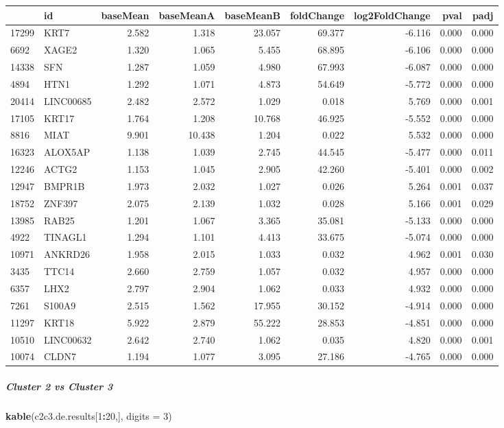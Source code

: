 \documentclass[]{article}
\newenvironment{Shaded}{\begin{snugshade}}{\end{snugshade}}
\newcommand{\DataTypeTok}[1]{\textcolor[rgb]{0.13,0.29,0.53}{#1}}
\newcommand{\DecValTok}[1]{\textcolor[rgb]{0.00,0.00,0.81}{#1}}
\newcommand{\KeywordTok}[1]{\textcolor[rgb]{0.13,0.29,0.53}{\textbf{#1}}}
\newcommand{\NormalTok}[1]{#1}
\newcommand{\OperatorTok}[1]{\textcolor[rgb]{0.81,0.36,0.00}{\textbf{#1}}}
\let\oldsubparagraph\subparagraph
\renewcommand{\subparagraph}[1]{\oldsubparagraph{#1}\mbox{}}
\begin{document}
\begin{longtable}[]{@{}llrrrrrrr@{}}
\toprule
& id & baseMean & baseMeanA & baseMeanB & foldChange & log2FoldChange &
pval & padj\tabularnewline
\midrule
\endhead
17299 & KRT7 & 2.582 & 1.318 & 23.057 & 69.377 & -6.116 & 0.000 &
0.000\tabularnewline
6692 & XAGE2 & 1.320 & 1.065 & 5.455 & 68.895 & -6.106 & 0.000 &
0.000\tabularnewline
14338 & SFN & 1.287 & 1.059 & 4.980 & 67.993 & -6.087 & 0.000 &
0.000\tabularnewline
4894 & HTN1 & 1.292 & 1.071 & 4.873 & 54.649 & -5.772 & 0.000 &
0.000\tabularnewline
20414 & LINC00685 & 2.482 & 2.572 & 1.029 & 0.018 & 5.769 & 0.000 &
0.001\tabularnewline
17105 & KRT17 & 1.764 & 1.208 & 10.768 & 46.925 & -5.552 & 0.000 &
0.000\tabularnewline
8816 & MIAT & 9.901 & 10.438 & 1.204 & 0.022 & 5.532 & 0.000 &
0.000\tabularnewline
16323 & ALOX5AP & 1.138 & 1.039 & 2.745 & 44.545 & -5.477 & 0.000 &
0.011\tabularnewline
12246 & ACTG2 & 1.153 & 1.045 & 2.905 & 42.260 & -5.401 & 0.000 &
0.002\tabularnewline
12947 & BMPR1B & 1.973 & 2.032 & 1.027 & 0.026 & 5.264 & 0.001 &
0.037\tabularnewline
18752 & ZNF397 & 2.075 & 2.139 & 1.032 & 0.028 & 5.166 & 0.001 &
0.029\tabularnewline
13985 & RAB25 & 1.201 & 1.067 & 3.365 & 35.081 & -5.133 & 0.000 &
0.000\tabularnewline
4922 & TINAGL1 & 1.294 & 1.101 & 4.413 & 33.675 & -5.074 & 0.000 &
0.000\tabularnewline
10971 & ANKRD26 & 1.958 & 2.015 & 1.033 & 0.032 & 4.962 & 0.001 &
0.030\tabularnewline
3435 & TTC14 & 2.660 & 2.759 & 1.057 & 0.032 & 4.957 & 0.000 &
0.000\tabularnewline
6357 & LHX2 & 2.797 & 2.904 & 1.062 & 0.033 & 4.932 & 0.000 &
0.000\tabularnewline
7261 & S100A9 & 2.515 & 1.562 & 17.955 & 30.152 & -4.914 & 0.000 &
0.000\tabularnewline
11297 & KRT18 & 5.922 & 2.879 & 55.222 & 28.853 & -4.851 & 0.000 &
0.000\tabularnewline
10510 & LINC00632 & 2.642 & 2.740 & 1.062 & 0.035 & 4.820 & 0.000 &
0.001\tabularnewline
10074 & CLDN7 & 1.194 & 1.077 & 3.095 & 27.186 & -4.765 & 0.000 &
0.000\tabularnewline
\bottomrule
\end{longtable}

\hypertarget{cluster-2-vs-cluster-3}{%
\subparagraph{Cluster 2 vs Cluster 3}\label{cluster-2-vs-cluster-3}}

\begin{Shaded}
\begin{Highlighting}[]
\KeywordTok{kable}\NormalTok{(c2c3.de.results[}\DecValTok{1}\OperatorTok{:}\DecValTok{20}\NormalTok{,], }\DataTypeTok{digits =} \DecValTok{3}\NormalTok{)}
\end{Highlighting}
\end{Shaded}
\end{document}
